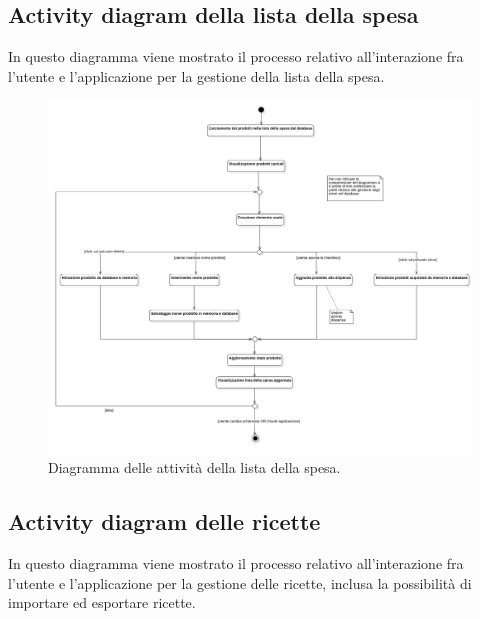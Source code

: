 \subsection{Activity diagram della lista della spesa}

In questo diagramma viene mostrato il processo relativo all'interazione fra l'utente e l'applicazione per la gestione della lista della spesa.

\begin{figure}[H]
    \includegraphics[width=\linewidth]{images/activity-shopping-list.png}
    \caption{Diagramma delle attività della lista della spesa.}
    \label{fig:actshoplist}
\end{figure}

\newpage

\subsection{Activity diagram delle ricette}

In questo diagramma viene mostrato il processo relativo all'interazione fra l'utente e l'applicazione per la gestione delle ricette, inclusa la possibilità di importare ed esportare ricette.


